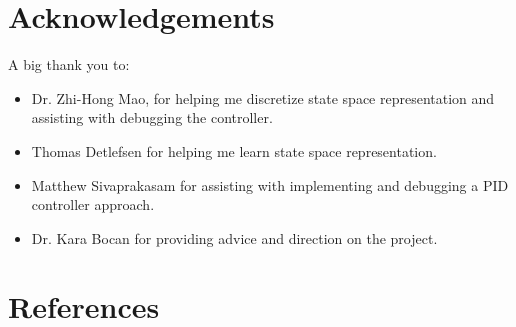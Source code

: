 \documentclass{article}
\begin{document}
\section{Acknowledgements}
\noindent A big thank you to:
\begin{itemize}
    \item Dr. Zhi-Hong Mao, for helping me discretize state space representation and assisting with debugging the controller.
    \item Thomas Detlefsen for helping me learn state space representation.
    \item Matthew Sivaprakasam for assisting with implementing and debugging a PID controller approach.
    \item Dr. Kara Bocan for providing advice and direction on the project.
\end{itemize}


\section{References}
\end{document}
